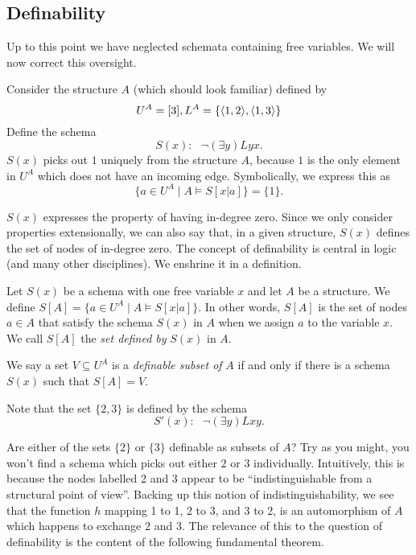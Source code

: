 \subsection{Definability}
Up to this point we have neglected schemata containing free variables. We will now correct this oversight. 

Consider the structure $A$ (which should look familiar) defined by
\[
    U^A = [3], L^A=\{\mbox{$\langle 1,2 \rangle$},\mbox{$\langle 1,3 \rangle$}\}
\]
Define the schema
\[
    S(x):\ \ \ \neg(\exists y)Lyx.
\]
$S(x)$ picks out $1$ uniquely from the structure $A$, because $1$ is the only element in $U^A$ which does not have an incoming edge. Symbolically, we express this as
\[
\{a\in U^A\mid A\models S[x|a]\}=\{1\}.
\]

$S(x)$ expresses the property of having in-degree zero. Since we only consider properties extensionally, we can also say that, in a given structure, $S(x)$ defines the set of nodes of in-degree zero. The concept of definability is central in logic (and many other disciplines). We enshrine it in a definition.

\begin{definition}
Let $S(x)$ be a schema with one free variable $x$ and let $A$ be a structure.
We define $S[A]=\{a\in U^A\mid A\models S[x|a]\}$. In other words, $S[A]$ is the set of nodes $a \in A$ that satisfy the schema $S(x)$ in $A$ when we assign $a$ to the variable $x$. We call $S[A]$ the \emph{set defined by} $S(x)$ in $A$.
\end{definition}

\begin{definition}
We say a set $V\subseteq U^A$ is a \emph{definable subset of} $A$ if and only if there is a schema $S(x)$ such that $S[A]=V$.
\end{definition}

Note that the set $\{2,3\}$ is defined by the schema
\[
S'(x):\ \ \ \neg(\exists y)Lxy.
\]

Are either of the sets $\{2\}$ or $\{3\}$ definable as subsets of $A$? Try as you might, you won't find a schema which picks out either $2$ or $3$ individually. Intuitively, this is because the nodes labelled 2 and 3 appear to be ``indistinguishable from a structural point of view''. Backing up this notion of indistinguishability, we see that the function $h$ mapping 1 to 1, 2 to 3, and 3 to 2, is an automorphism of $A$ which happens to exchange $2$ and $3$. The relevance of this to the question of definability is the content of the following fundamental theorem.

